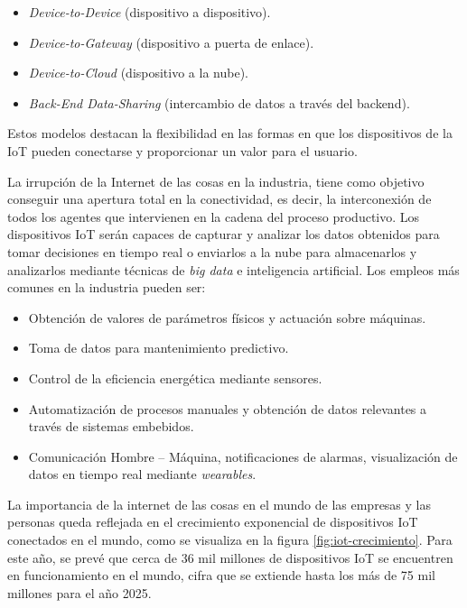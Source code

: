 \begin{itemize}
	\item \textit{Device-to-Device} (dispositivo a dispositivo).
	\item \textit{Device-to-Gateway} (dispositivo a puerta de enlace).
	\item \textit{Device-to-Cloud} (dispositivo a la nube).
	\item \textit{Back-End Data-Sharing} (intercambio de datos a través del backend).
\end{itemize}

Estos modelos destacan la flexibilidad en las formas en que los dispositivos de la IoT pueden conectarse y proporcionar un valor para el usuario.

La irrupción de la Internet de las cosas en la industria, tiene como objetivo conseguir una apertura total en la conectividad, es decir, la interconexión de todos los agentes que intervienen en la cadena del proceso productivo. Los dispositivos IoT serán capaces de capturar y analizar los datos obtenidos para tomar decisiones en tiempo real o enviarlos a la nube para almacenarlos y analizarlos mediante técnicas de \textit{big data}  e inteligencia artificial. Los empleos más comunes en la industria pueden ser:
\begin{itemize}
	\item Obtención de valores de parámetros físicos y actuación sobre máquinas.
	\item Toma de datos para mantenimiento predictivo. 
	\item Control de la eficiencia energética mediante sensores.
	\item Automatización de procesos manuales y obtención de datos relevantes a través de sistemas embebidos.
	\item Comunicación Hombre – Máquina, notificaciones de alarmas, visualización de datos en tiempo real mediante \textit{wearables}.
\end{itemize}

La importancia de la internet de las cosas en el mundo de las empresas y las personas queda reflejada en el crecimiento exponencial de dispositivos IoT conectados en el mundo, como se visualiza en la figura  \ref{fig:iot-crecimiento}. Para este año, se prevé que cerca de 36 mil millones de dispositivos IoT se encuentren en funcionamiento en el mundo, cifra que se extiende hasta los más de 75 mil millones para el año 2025.

